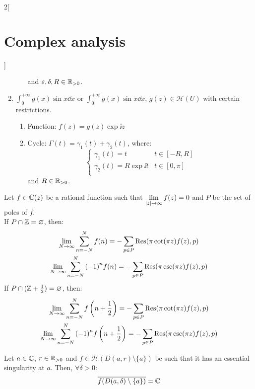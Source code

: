 \documentclass[../../../main_math.tex]{subfiles}
\begin{document}
\begin{multicols}{2}[\section{Complex analysis}]
\begin{proposition}
\begin{enumerate}
\begin{enumerate}
$$                    $$
                    and $\varepsilon,\delta,R\in\mathbb{R}_{>0}$.
            \end{enumerate}
      \item $\displaystyle\int_0^{+\infty} g(x)\sin{x}\dd{x}$ or $\displaystyle\int_0^{+\infty} g(x)\sin{x}\dd{x}$, $g(z)\in\mathcal{H}(U)$ with certain restrictions.
            \begin{enumerate}
              \item Function: $f(z)=g(z)\exp{\ii z}$
              \item Cycle:  $\Gamma(t)=\gamma_1(t)+\gamma_2(t)$, where:
                    $$
                      \begin{cases}
                        \gamma_1(t)=t            & t\in[-R,R]  \\
                        \gamma_2(t)=R\exp{\ii t} & t\in[0,\pi] \\
                      \end{cases}
                    $$
                    and $R\in\mathbb{R}_{>0}$.
            \end{enumerate}
    \end{enumerate}
  \end{proposition}
  \begin{theorem}
    Let $f\in\mathbb{C}(z)$ be a rational function such that $\displaystyle\lim_{\abs{z}\to\infty}f(z)=0$ and $P$ be the set of poles of $f$. \\
    If $P\cap\mathbb{Z}=\varnothing$, then:
    \begin{gather*}
      \lim_{N\to\infty}\sum_{n=-N}^Nf(n)         =-\sum_{p\in P}\Res(\pi\cot(\pi z)f(z),p) \\
      \lim_{N\to\infty}\sum_{n=-N}^N{(-1)}^nf(n) =-\sum_{p\in P}\Res(\pi\csc(\pi z)f(z),p)
    \end{gather*}
    If $P\cap(\mathbb{Z}+\frac{1}{2})=\varnothing$, then:
    \begin{gather*}
      \lim_{N\to\infty}\sum_{n=-N}^Nf\left(n+\frac{1}{2}\right)         =-\sum_{p\in P}\Res(\pi\cot(\pi z)f(z),p) \\
      \lim_{N\to\infty}\sum_{n=-N}^N{(-1)}^nf\left(n+\frac{1}{2}\right) =-\sum_{p\in P}\Res(\pi\csc(\pi z)f(z),p)
    \end{gather*}
  \end{theorem}
  \begin{theorem}
    Let $a\in\mathbb{C}$, $r\in\mathbb{R}_{>0}$ and $f\in\mathcal{H}(D(a,r)\setminus\{a\})$ be such that it has an essential singularity at $a$. Then, $\forall \delta>0$: $$\overline{f(D(a,\delta)\setminus\{a\})}=\mathbb{C}$$

\end{theorem}
\end{multicols}
\end{document}
